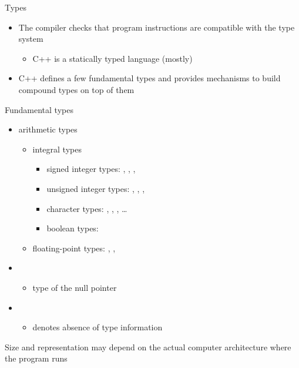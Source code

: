 \begin{frame}{Types \insertcontinuationtext}

  \begin{itemize}[<+->]
  \item The compiler checks that program instructions are compatible with the type system
    \begin{itemize}
    \item C++ is a \alert{statically typed} language (mostly)
    \end{itemize}
  \item C++ defines a few fundamental types and provides mechanisms to build
    compound types on top of them
  \end{itemize}

\end{frame}

\begin{frame}{Fundamental types}
  \begin{itemize}
    \item arithmetic types
      \begin{itemize}
        \item integral types
          \begin{itemize}
          \item signed integer types: , \alert<3->{},
            , 
          \item unsigned integer types: ,
            , , 
          \item character types: \alert<3->{}, ,
            , \ldots
          \item boolean types: \alert<3->{}
          \end{itemize}
        \item floating-point types: , \alert<3->{}, 
      \end{itemize}
    \item {}
      \begin{itemize}
      \item type of the null pointer 
      \end{itemize}
    \item {}
      \begin{itemize}
      \item denotes absence of type information
      \end{itemize}
  \end{itemize}

  \pause

  Size and representation may depend on the actual computer architecture where
  the program runs

\end{frame}

